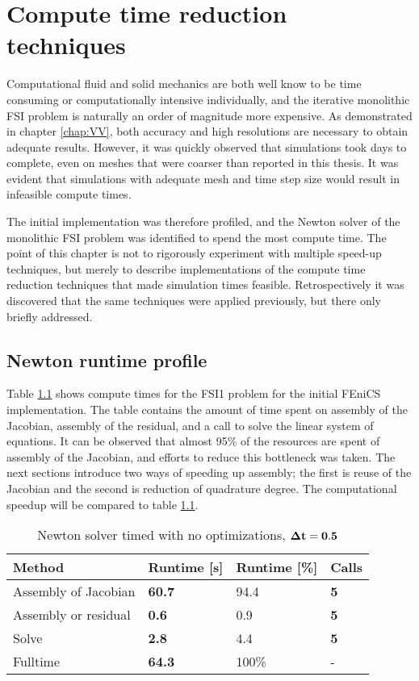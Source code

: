 \chapter{Compute time reduction techniques}\label{runtime}
Computational fluid and solid mechanics are both well know to be time consuming or computationally intensive individually, and the iterative monolithic FSI problem is naturally an order of magnitude more expensive. As demonstrated in chapter \ref{chap:VV}, both accuracy and high resolutions are necessary to obtain adequate results. However, it was quickly observed that simulations took days to complete, even on meshes that were coarser than reported in this thesis. It was evident that simulations with adequate mesh and time step size would result in infeasible compute times. 

The initial implementation was therefore profiled, and the Newton solver of the monolithic FSI problem was identified to spend the most compute time. The point of this chapter is not to rigorously experiment with multiple speed-up techniques, but merely to describe implementations of the compute time reduction techniques that made simulation times feasible. Retrospectively it was discovered that the same techniques were applied previously\cite{Sciences2012}, but there only briefly addressed. 

\section{Newton runtime profile}
Table \ref{no_opt} shows compute times for the FSI1 problem for the initial FEniCS implementation. The table contains the amount of time spent on assembly of the Jacobian, assembly of the residual, and a call to solve the linear system of equations. It can be observed that almost 95\% of the resources are spent of assembly of the Jacobian, and efforts to reduce this bottleneck was taken. The next sections introduce two ways of speeding up assembly; the first is reuse of the Jacobian and the second is reduction of quadrature degree. The computational speedup will be compared to table \ref{no_opt}.

\begin{table}[H]
\centering
\caption{Newton solver timed with no optimizations, $\bold{\Delta t = 0.5}$ }
\label{no_opt}
\begin{tabular}{|l|l|l|l|}
\hline
Method               & \textbf{Runtime {{[}}s{{]}}} & Runtime {{[}}\%{{]}} & \textbf{Calls} \\ \hline
Assembly of Jacobian & \textbf{60.7}                    & 94.4                     & \textbf{5}     \\ \hline
Assembly or residual & \textbf{0.6}                     & 0.9                      & \textbf{5}     \\ \hline
Solve                & \textbf{2.8}                     & 4.4                      & \textbf{5}     \\ \hline
Fulltime             & \textbf{64.3}                    & 100\%                    & -                \\ \hline
\end{tabular}
\end{table}

